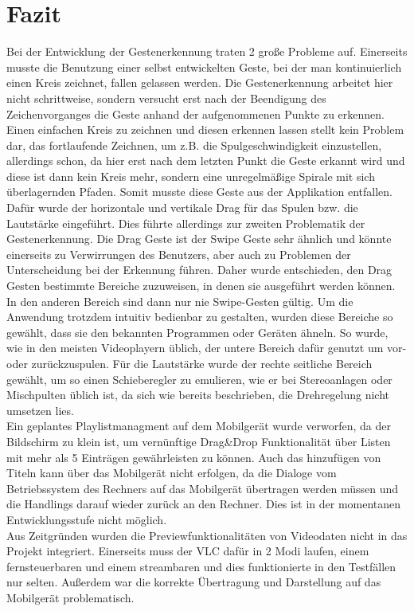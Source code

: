 \documentclass[a4paper,12pt]{article}
\begin{document}
\section{Fazit}
Bei der Entwicklung der Gestenerkennung traten 2 große Probleme auf. Einerseits musste die Benutzung einer selbst entwickelten Geste, bei der man kontinuierlich einen Kreis zeichnet, fallen gelassen werden. Die Gestenerkennung arbeitet hier nicht schrittweise, sondern versucht erst nach der Beendigung des Zeichenvorganges die Geste anhand der aufgenommenen Punkte zu erkennen. Einen einfachen Kreis zu zeichnen und diesen  erkennen lassen stellt kein Problem dar, das fortlaufende Zeichnen, um z.B. die Spulgeschwindigkeit einzustellen, allerdings schon, da hier erst nach dem letzten Punkt die Geste erkannt wird und diese ist dann kein Kreis mehr, sondern eine unregelmäßige Spirale mit sich überlagernden Pfaden. Somit musste diese Geste aus der Applikation entfallen. Dafür wurde der horizontale und vertikale Drag für das Spulen bzw. die Lautstärke eingeführt. Dies führte allerdings zur zweiten Problematik der Gestenerkennung. Die Drag Geste ist der Swipe Geste sehr ähnlich und könnte einerseits zu Verwirrungen des Benutzers, aber auch zu Problemen der Unterscheidung bei der Erkennung führen. Daher wurde entschieden, den Drag Gesten bestimmte Bereiche zuzuweisen, in denen sie ausgeführt werden können. In den anderen Bereich sind dann nur nie Swipe-Gesten gültig. Um die Anwendung trotzdem intuitiv bedienbar zu gestalten, wurden diese Bereiche so gewählt, dass sie den bekannten Programmen oder Geräten ähneln. So wurde, wie in den meisten Videoplayern üblich, der untere Bereich dafür genutzt um vor- oder zurückzuspulen. Für die Lautstärke wurde der rechte seitliche Bereich gewählt, um so einen Schieberegler zu emulieren, wie er bei Stereoanlagen oder Mischpulten üblich ist, da sich wie bereits beschrieben, die Drehregelung nicht umsetzen lies.\\
Ein geplantes Playlistmanagment auf dem Mobilgerät wurde verworfen, da der Bildschirm zu klein ist, um vernünftige Drag\&Drop Funktionalität über Listen mit mehr als 5 Einträgen gewährleisten zu können. Auch das hinzufügen von Titeln kann über das Mobilgerät nicht erfolgen, da die Dialoge vom Betriebssystem des Rechners auf das Mobilgerät übertragen werden müssen und die Handlings darauf wieder zurück an den Rechner. Dies ist in der momentanen Entwicklungsstufe nicht möglich.\\
Aus Zeitgründen wurden die Previewfunktionalitäten von Videodaten nicht in das Projekt integriert. Einerseits muss der VLC dafür in 2 Modi laufen, einem fernsteuerbaren und einem streambaren und dies funktionierte in den Testfällen nur selten. Außerdem war die korrekte Übertragung und Darstellung auf das Mobilgerät problematisch. \\
\end{document}
